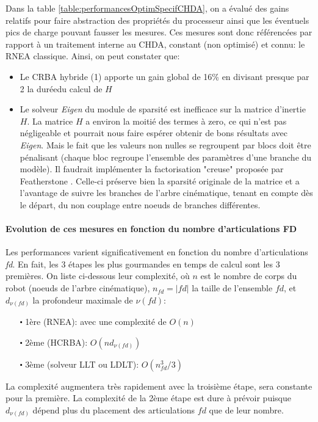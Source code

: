 \documentclass{report}
\begin{document}
Dans la table \ref{table:performancesOptimSpecifCHDA}, on a évalué des gains relatifs pour faire abstraction des propriétés du processeur ainsi que les éventuels pics de charge pouvant fausser les mesures. Ces mesures sont donc référencées par rapport à un traitement interne au CHDA, constant (non optimisé) et connu: le RNEA classique. Ainsi, on peut constater que:
\begin{itemize}
\item Le CRBA hybride (1) apporte un gain global de 16\% en divisant presque par 2 la duréedu calcul de $H$
\item Le solveur \emph{Eigen} du module de sparsité est inefficace sur la matrice d'inertie $H$. La matrice $H$ a environ la moitié des termes à zero, ce qui n'est pas négligeable et pourrait nous faire espérer obtenir de bons résultats avec \emph{Eigen}.  Mais le fait que les valeurs non nulles se regroupent par blocs doit être pénalisant (chaque bloc regroupe l'ensemble des paramètres d'une branche du modèle). Il faudrait implémenter la factorisation "creuse" proposée par Featherstone \cite[p112]{bib_featherstone}. Celle-ci préserve bien la sparsité originale de la matrice et a l'avantage de suivre les branches de l'arbre cinématique, tenant en compte dès le départ, du non couplage entre noeuds de branches différentes.
\end{itemize}


\paragraph{Evolution de ces mesures en fonction du nombre d'articulations FD}

Les performances varient significativement en fonction du nombre d'articulations \emph{fd}. En fait, les 3 étapes les plus gourmandes en temps de calcul sont les 3 premières. On liste ci-dessous leur complexité, où $n$ est le nombre de corps du robot (noeuds de l'arbre cinématique), $n_{fd}=|fd|$ la taille de l'ensemble $fd$, et $d_{\nu(fd)}$ la profondeur maximale de $\nu(fd)$:
\begin{itemize}
\item[$\centerdot$ 1ère (RNEA):] avec une complexité de $O(n)$
\item[$\centerdot$ 2ème (HCRBA):] $O(nd_{\nu(fd)})$
\item[$\centerdot$ 3ème (solveur LLT ou LDLT):] $O(n_{fd}^3/3)$
\end{itemize}
\noindent
La complexité augmentera très rapidement avec la troisième étape, sera constante pour la première. La complexité de la 2ème étape est dure à prévoir puisque $d_{\nu(fd)}$ dépend plus du placement des articulations $fd$ que de leur nombre.
\end{document}
